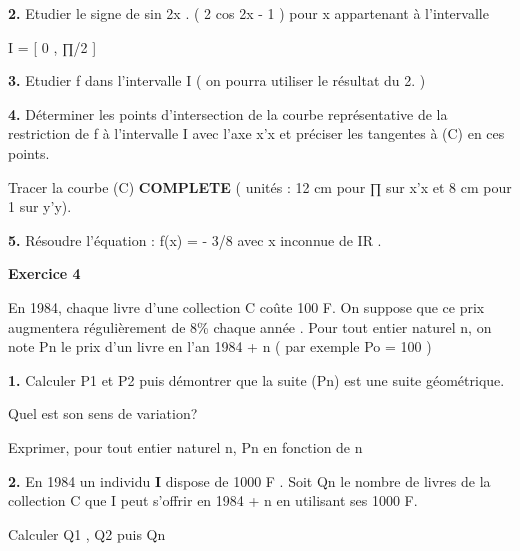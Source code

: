 \documentclass[11pt,a4paper]{article}
\begin{document}
\textbf{2.} Etudier le signe de sin 2x . ( 2 cos 2x - 1 ) pour x appartenant à l'intervalle

I = [ 0 , ∏/2 ]

\textbf{3.} Etudier f dans l'intervalle I ( on pourra utiliser le résultat du 2. )

\textbf{4.} Déterminer les points d'intersection de la courbe représentative de la restriction de f à l'intervalle I avec l'axe x'x et préciser les tangentes à (C) en ces points.

Tracer la courbe (C) \textbf{COMPLETE} ( unités : 12 cm pour ∏ sur x'x et 8 cm pour 1 sur y'y).

\textbf{5.} Résoudre l'équation : f(x) = - 3/8 avec x inconnue de IR .

\textbf{Exercice 4}

En 1984, chaque livre d'une collection C coûte 100 F. On suppose que ce prix augmentera régulièrement de 8\% chaque année . Pour tout entier naturel n, on note Pn le prix d'un livre en l'an 1984 + n ( par exemple Po = 100 )

\textbf{1.} Calculer P1 et P2 puis démontrer que la suite (Pn) est une suite géométrique.

Quel est son sens de variation?

Exprimer, pour tout entier naturel n, Pn en fonction de n

\textbf{2.} En 1984 un individu \textbf{I} dispose de 1000 F . Soit Qn le nombre de livres de la collection C que I peut s'offrir en 1984 + n en utilisant ses 1000 F.

Calculer Q1 , Q2 puis Qn
\end{document}
